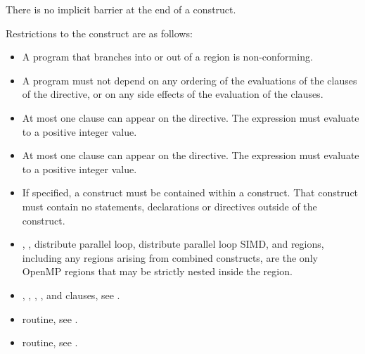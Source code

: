 {{{{There is no implicit barrier at the end of a  construct.

\restrictions
Restrictions to the  construct are as follows:

\begin{itemize}
\item A program that branches into or out of a  region is non-conforming.

\item A program must not depend on any ordering of the evaluations of the clauses of the 
 directive, or on any side effects of the evaluation of the clauses.

\item At most one  clause can appear on the directive. The 
 expression must evaluate to a positive integer value.

\item At most one  clause can appear on the directive. The 
expression must evaluate to a positive integer value.

\item If specified, a  construct must be contained within a  construct. That  construct must contain no statements, declarations or directives outside of the  construct.

\item {}, , distribute parallel loop,
distribute parallel loop SIMD, and  regions, including any
 regions arising from combined constructs, are the only OpenMP regions
that may be strictly nested inside the  region.

\end{itemize}

\crossreferences
\begin{itemize}

\item {}, , , , and  clauses, see 
.

\item {} routine, see 
.

\item {} routine, see 
.
\end{itemize}









}}}}
